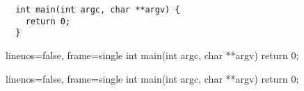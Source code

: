 \documentclass{article}
\begin{document}
\begin{verbatim}
  int main(int argc, char **argv) {
    return 0;
  }
\end{verbatim}

\begin{cppcode}{linenos=false, frame=single}
  int main(int argc, char **argv) {
    return 0;
  }
\end{cppcode}

\begin{cppcode*}{linenos=false, frame=single}
  int main(int argc, char **argv) {
    return 0;
  }
\end{cppcode*}
\end{document}
